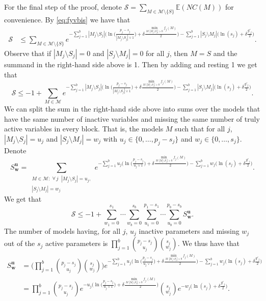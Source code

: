 \documentclass[bj,authoryear]{imsart}
\theoremstyle{plain}
\newcommand{\E}{\mathbb{E}}
\newcommand{\M}{\mathcal{M}}
\newcommand{\bs}{\boldsymbol}
\begin{document}
For the final step of the proof, denote $\mathcal{S}= \sum_{M \in \M\setminus \{S\}} \E\left(NC(M)\right)$ for convenience. By \eqref{eq:fyvbis} we have that
\begin{align*}
    \mathcal{S} &\leq \sum_{M \in \M\setminus \{S\}}e^{- \sum_{j=1}^b |M_j\setminus S_j|\big(\ln\big(\tfrac{p_j-s_j}{|M_j\setminus S_j|\vee 1}\big)+\delta \tfrac{\min_{M: |M_j\setminus S_j|>0}f_j(M)}{2}\big)-\sum_{j=1}^b |S_j\setminus M_j|\big(\ln(s_j)+\delta \tfrac{g'_j}{2}\big)}.
\end{align*}
Observe that if $|M_j\setminus S_j|=0$ and $|S_j\setminus M_j|=0$ for all $j$, then $M=S$ and the summand in the right-hand side above is 1. Then by adding and resting 1 we get that
$$\mathcal{S} \leq -1+\sum_{M \in \M}e^{- \sum_{j=1}^b |M_j\setminus S_j|\big(\ln\big(\tfrac{p_j-s_j}{|M_j\setminus S_j|\vee 1}\big)+\delta \tfrac{\min_{M: |M_j\setminus S_j|>0}f_j(M)}{2}\big)-\sum_{j=1}^b |S_j\setminus M_j|\big(\ln(s_j)+\delta \tfrac{g'_j}{2}\big)}.$$
We can split the sum in the right-hand side above into sums over the models that have the same number of inactive variables and missing the same number of truly active variables in every block. That is, the models $M$ such that for all $j$, $|M_j\setminus S_j|=u_j$ and $|S_j\setminus M_j|=w_j$ with $u_j \in \{0,\ldots,p_j-s_j\}$ and $w_j \in \{0,\ldots,s_j\}$. Denote
$$S^{\bs u}_{\bs w}=\sum_{\substack{M \in \M:\;\forall \,j\;\; |M_j\setminus S_j|=u_j,\\ |S_j\setminus M_j|=w_j }} e^{- \sum_{j=1}^b u_j\big(\ln\big(\tfrac{p_j-s_j}{u_j\vee 1}\big)+\delta \tfrac{\min_{M: |M_j\setminus S_j|>0}f_j(M)}{2}\big)-\sum_{j=1}^b w_j\big(\ln(s_j)+\delta \tfrac{g'_j}{2}\big)}.$$
We get that
\begin{equation}\label{eq:uygfewbis}
    \mathcal{S} \leq -1+\sum_{w_1=0}^{s_1}\cdots\sum_{w_b=0}^{s_b}\sum_{u_1=0}^{p_1-s_1}\cdots\sum_{u_b=0}^{p_b-s_b}S^{\bs u}_{\bs w}.
\end{equation}
The number of models having, for all $j$, $u_j$ inactive parameters and missing $w_j$ out of the $s_j$ active parameters %
is $\prod_{j=1}^b {\binom{p_j-s_j}{u_j}}{\binom{s_j}{w_j}}$. We thus have that
\begin{align*}
    S^{\bs u}_{\bs w}&= \bigg(\prod_{j=1}^b {\binom{p_j-s_j}{u_j}}{\binom{s_j}{w_j}}\bigg)e^{- \sum_{j=1}^b u_j\big(\ln\big(\tfrac{p_j-s_j}{u_j\vee 1}\big)+\delta \tfrac{\min_{M: |M_j\setminus S_j|>0}f_j(M)}{2}\big)-\sum_{j=1}^b w_j\big(\ln(s_j)+\delta \tfrac{g'_j}{2}\big)} \\
    &= \prod_{j=1}^b {\binom{p_j-s_j}{u_j}}e^{- u_j\big(\ln\big(\tfrac{p_j-s_j}{u_j\vee 1}\big)+\delta \tfrac{\min_{M: |M_j\setminus S_j|>0}f_j(M)}{2}\big)}{\binom{s_j}{w_j}}e^{-w_j\big(\ln(s_j)+\delta \tfrac{g'_j}{2}\big)}.
\end{align*}
\end{document}
